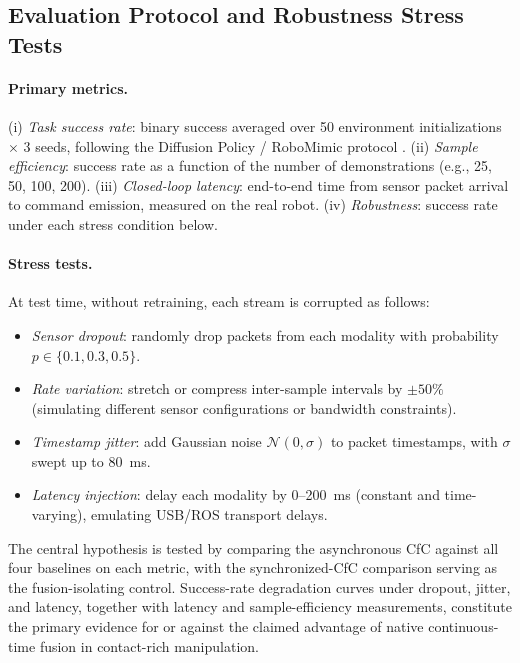 \documentclass[conference]{IEEEtran}
\begin{document}
\subsection{Evaluation Protocol and Robustness Stress Tests}
\paragraph{Primary metrics.}
(i) \emph{Task success rate}: binary success averaged over 50 environment initializations $\times$ 3 seeds, following the Diffusion Policy / RoboMimic protocol \cite{chi2023diffusion,robomimic2021}. (ii) \emph{Sample efficiency}: success rate as a function of the number of demonstrations (e.g., 25, 50, 100, 200). (iii) \emph{Closed-loop latency}: end-to-end time from sensor packet arrival to command emission, measured on the real robot. (iv) \emph{Robustness}: success rate under each stress condition below.

\paragraph{Stress tests.}
At test time, without retraining, each stream is corrupted as follows:
\begin{itemize}
\item \textit{Sensor dropout}: randomly drop packets from each modality with probability $p \in \{0.1, 0.3, 0.5\}$.
\item \textit{Rate variation}: stretch or compress inter-sample intervals by $\pm 50\%$ (simulating different sensor configurations or bandwidth constraints).
\item \textit{Timestamp jitter}: add Gaussian noise $\mathcal{N}(0, \sigma)$ to packet timestamps, with $\sigma$ swept up to 80~ms.
\item \textit{Latency injection}: delay each modality by 0--200~ms (constant and time-varying), emulating USB/ROS transport delays.
\end{itemize}
The central hypothesis is tested by comparing the asynchronous CfC against all four baselines on each metric, with the synchronized-CfC comparison serving as the fusion-isolating control. Success-rate degradation curves under dropout, jitter, and latency, together with latency and sample-efficiency measurements, constitute the primary evidence for or against the claimed advantage of native continuous-time fusion in contact-rich manipulation.



\end{document}
